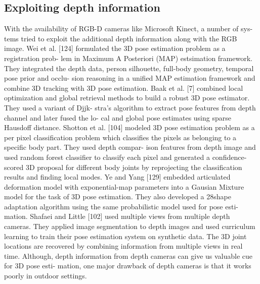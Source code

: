 \subsection{Exploiting depth information}

With the availability of RGB-D cameras like Microsoft Kinect, a number of sys-
tems tried to exploit the additional depth information along with the RGB image.
Wei et al. [124] formulated the 3D pose estimation problem as a registration prob-
lem in Maximum A Posteriori (MAP) estsimation framework. They integrated the
depth data, person silhouette, full-body geometry, temporal pose prior and occlu-
sion reasoning in a unified MAP estimation framework and combine 3D tracking
with 3D pose estimation. Baak et al. [7] combined local optimization and global
retrieval methods to build a robust 3D pose estimator. They used a variant of Djjk-
stra’s algorithm to extract pose features from depth channel and later fused the lo-
cal and global pose estimates using sparse Hausdoff distance. Shotton et al. [104]
modeled 3D pose estimation problem as a per pixel classification problem which
classifies the pixels as belonging to a specific body part. They used depth compar-
ison features from depth image and used random forest classifier to classify each
pixel and generated a confidence-scored 3D proposal for different body joints by
reprojecting the classification results and finding local modes. Ye and Yang [129]
embedded articulated deformation model with exponential-map parameters into a
Gausian Mixture model for the task of 3D pose estimation. They also developed a
28shape adaptation algorithm using the same probabilistic model used for pose esti-
mation. Shafaei and Little [102] used multiple views from multiple depth cameras.
They applied image segmentation to depth images and used curriculum learning
to train their pose estimation system on synthetic data. The 3D joint locations are
recovered by combining information from multiple views in real time. Although,
depth information from depth cameras can give us valuable cue for 3D pose esti-
mation, one major drawback of depth cameras is that it works poorly in outdoor
settings.
